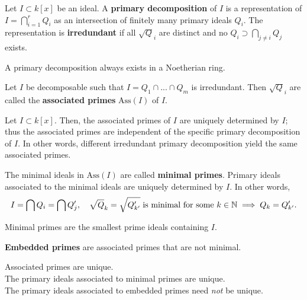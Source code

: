 \begin{defi}
  Let \( I \subset k[x] \) be an ideal. A \textbf{primary decomposition} of \( I \) is a representation of \( I = \bigcap_{i=1}^r Q_{i} \) as an intersection of finitely many primary ideals \( Q_i \). The representation is \textbf{irredundant} if all \( \sqrt Q_i \) are distinct and no \( Q_i \supset \bigcap_{j \neq i} Q_j  \) exists.
\end{defi}

\begin{cor}
  A primary decomposition always exists in a Noetherian ring.
\end{cor}

\begin{defi}
  Let \( I \) be decomposable such that \( I = Q_1 \cap ... \cap Q_m \) is irredundant. Then \( \sqrt Q_i \) are called the \textbf{associated primes} \( \mathrm{Ass}(I) \) of \( I \).
\end{defi}

\begin{prop}[1st uniqueness]
  Let \( I \subset k[x] \). Then, the associated primes of \( I \) are uniquely determined by \( I \); thus the associated primes are independent of the specific primary decomposition of \( I \). In other words, different irredundant primary decomposition yield the same associated primes.
\end{prop}

\begin{prop}[2nd uniqueness]
  The minimal ideals in \( \mathrm{Ass}(I) \) are called \textbf{minimal primes}. Primary ideals associated to the minimal ideals are uniquely determined by \( I \). In other words, 
  \begin{align*}
    I = \bigcap Q_i = \bigcap Q'_j, \quad \sqrt Q_k = \sqrt {Q'_{k'}} \; \text{is minimal for some \( k \in \mathbb N \)} \implies Q_k = Q_{k'}'.
  \end{align*}
\end{prop}

\begin{prop}
  Minimal primes are the smallest prime ideals containing \( I \).
\end{prop}

\begin{defi}
  \textbf{Embedded primes} are associated primes that are not minimal.
\end{defi}

\begin{mdframed}
  Associated primes are unique. \\
  The primary ideals associated to minimal primes are unique. \\
  The primary ideals associated to embedded primes need \emph{not} be unique.
\end{mdframed}

